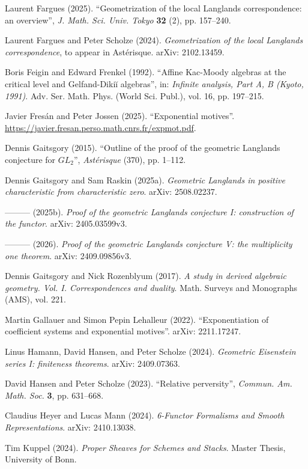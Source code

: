 \begin{list}{}{\setlength{\leftmargin}{2em}\setlength{\itemindent}{-2em}\setlength{\labelwidth}{0pt}\setlength{\labelsep}{0pt}\setlength{\itemsep}{0.3em}\setlength{\parsep}{0pt}\setlength{\topsep}{0.4em}}
\item Laurent Fargues (2025). “Geometrization of the local Langlands correspondence: an overview”, \textit{J. Math. Sci. Univ. Tokyo} \textbf{32} (2), pp. 157–240.
\item Laurent Fargues and Peter Scholze (2024). \textit{Geometrization of the local Langlands correspondence}, to appear in Astérisque. arXiv: 2102.13459.
\item Boris Feigin and Edward Frenkel (1992). “Affine Kac-Moody algebras at the critical level and Gelfand-Dikiĭ algebras”, in: \textit{Infinite analysis, Part A, B (Kyoto, 1991)}. Adv. Ser. Math. Phys. (World Sci. Publ.), vol. 16, pp. 197–215.
\item Javier Fresán and Peter Jossen (2025). “Exponential motives”. \url{https://javier.fresan.perso.math.cnrs.fr/expmot.pdf}.
\item Dennis Gaitsgory (2015). “Outline of the proof of the geometric Langlands conjecture for $GL_2$”, \textit{Astérisque} (370), pp. 1–112.
\item Dennis Gaitsgory and Sam Raskin (2025a). \textit{Geometric Langlands in positive characteristic from characteristic zero}. arXiv: 2508.02237.
\item ——— (2025b). \textit{Proof of the geometric Langlands conjecture I: construction of the functor}. arXiv: 2405.03599v3.
\item ——— (2026). \textit{Proof of the geometric Langlands conjecture V: the multiplicity one theorem}. arXiv: 2409.09856v3.
\item Dennis Gaitsgory and Nick Rozenblyum (2017). \textit{A study in derived algebraic geometry. Vol. I. Correspondences and duality}. Math. Surveys and Monographs (AMS), vol. 221.
\item Martin Gallauer and Simon Pepin Lehalleur (2022). “Exponentiation of coefficient systems and exponential motives”. arXiv: 2211.17247.
\item Linus Hamann, David Hansen, and Peter Scholze (2024). \textit{Geometric Eisenstein series I: finiteness theorems}. arXiv: 2409.07363.
\item David Hansen and Peter Scholze (2023). “Relative perversity”, \textit{Commun. Am. Math. Soc.} \textbf{3}, pp. 631–668.
\item Claudius Heyer and Lucas Mann (2024). \textit{6-Functor Formalisms and Smooth Representations}. arXiv: 2410.13038.
\item Tim Kuppel (2024). \textit{Proper Sheaves for Schemes and Stacks}. Master Thesis, University of Bonn.

\end{list}
